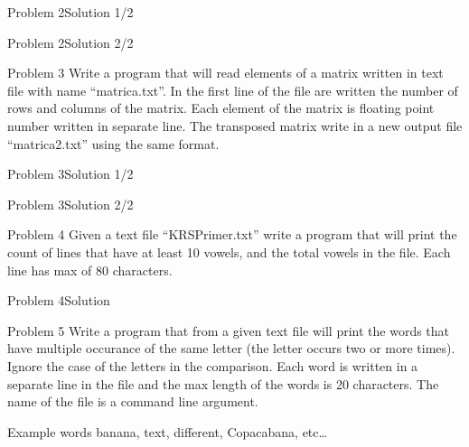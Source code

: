 \begin{frame}[fragile]{Problem 2}{Solution 1/2} 

\end{frame}



\begin{frame}[fragile]{Problem 2}{Solution 2/2} 

\end{frame}

\begin{frame}{Problem 3}
Write a program that will read elements of a matrix written in text file with
name ``matrica.txt''. In the first line of the file are written the number of
rows and columns of the matrix. Each element of the matrix is floating point
number written in separate line. The transposed matrix write in a new output
file ``matrica2.txt'' using the same format.
\end{frame}

\begin{frame}[fragile]{Problem 3}{Solution 1/2} 

\end{frame}



\begin{frame}[fragile]{Problem 3}{Solution 2/2} 

\end{frame}


\begin{frame}{Problem 4}
Given a text file ``KRSPrimer.txt'' write a program that will print the count of
lines that have at least 10 vowels, and the total vowels in the file. Each line
has max of 80 characters.
\end{frame}

\begin{frame}[fragile]{Problem 4}{Solution}

\end{frame}

\begin{frame}{Problem 5}
Write a program that from a given text file will print the words that have
multiple occurance of the same letter (the letter occurs two or more times).
Ignore the case of the letters in the comparison. Each word is written in a
separate line in the file and the max length of the words is 20 characters. The
name of the file is a command line argument.
\begin{exampleblock}{Example words}
banana, text, different, Copacabana, etc\ldots
\end{exampleblock}
\end{frame}

